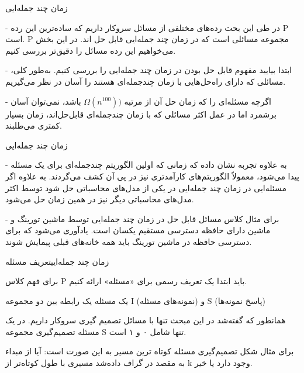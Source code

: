 \begin{itemframe}{زمان چند جمله‌ایی}
\decLineSpace
\item[-]
در طی این بحث رده‌های مختلفی از مسائل سروکار داریم که ساده‌ترین این رده P است. P مجموعه مسائلی است که در زمان چند جمله‌ایی قابل حل اند. در این بخش می‌خواهیم این رده مسائل را دقیق‌تر بررسی کنیم.
\item[-]
ابتدا بیایید مفهوم قابل حل بودن در زمان چند جمله‌ایی را بررسی کنیم. به‌طور کلی، مسائلی که دارای راه‌حل‌هایی با زمان چندجمله‌ای هستند را آسان در نظر می‌گیریم.
\item[-]
اگرچه مسئله‌ای را که زمان حل آن از مرتبه
$\Omega(n^{100}))$
 باشد، نمی‌توان آسان برشمرد اما در عمل اکثر مسائلی که با زمان چندجمله‌ای قابل‌حل‌اند، زمان بسیار کمتری می‌طلبند.


\end{itemframe}

\begin{itemframe}{زمان چند جمله‌ایی}
\item[-]
به علاوه تجربه نشان داده که زمانی که اولین الگوریتم چندجمله‌ای برای یک مسئله پیدا می‌شود، معمولاً الگوریتم‌های کارآمدتری نیز در پی آن کشف می‌گردند. به علاوه اگر مسئله‌ایی در زمان چند جمله‌ایی در یکی از مدل‌های محاسباتی حل شود توسط اکثر مدل‌های محاسباتی دیگر نیز در همین زمان حل می‌شود.
\item[-]
برای مثال کلاس مسائل قابل حل در زمان چند جمله‌ایی توسط ماشین تورینگ و ماشین دارای حافظه دسترسی مستقیم یکسان است.
‌یادآوری می‌شود که برای دسترسی حافظه در ماشین تورینگ باید همه خانه‌های قبلی پیمایش شوند.

\end{itemframe}


\begin{itemframe-s}{زمان چند جمله‌ایی}{تعریف مسئله}
\item[-]
برای فهم کلاس P باید ابتدا یک تعریف رسمی برای «مسئله» ارائه کنیم.
\item[-]
یک مسئله یک رابطه بین دو مجموعه I (نمونه‌های مسئله) و S (پاسخ نمونه‌ها)

همانطور که گفته‌شد در این مبحث تنها با مسائل تصمیم گیری سروکار داریم.
در یک مسئله تصمیم‌گیری مجموعه S تنها شامل ۰ و ۱ است.
\item[-]
برای مثال شکل تصمیم‌گیری مسئله کوتاه ترین مسیر به این صورت است:
آیا از مبداء به مقصد در گراف داده‌شد مسیری با طول کوتاه‌تر از k وجود دارد یا خیر.

\end{itemframe-s}

